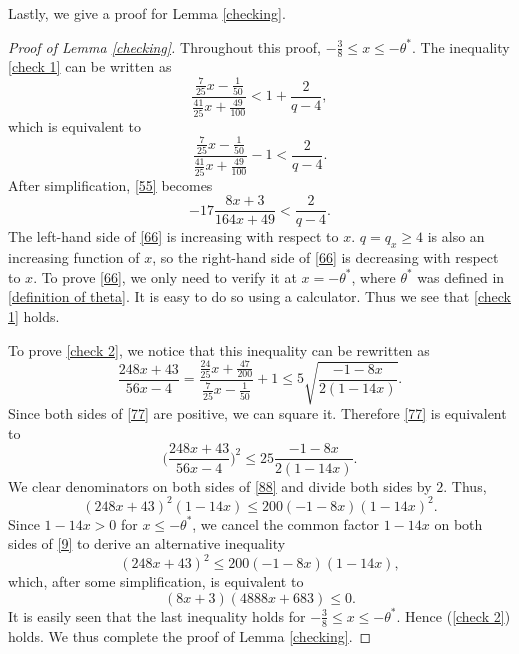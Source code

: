 \documentclass[11pt]{amsart}
\numberwithin{equation}{section}
\theoremstyle{definition}
\theoremstyle{proposition}
\begin{document}
Lastly, we give a proof for Lemma \ref{checking}.
\begin{proof} [Proof of Lemma \ref{checking}] Throughout this proof, $-\frac{3}{8}\le x\le -\theta^*$. The inequality
\eqref{check 1} can be written as
\[
\frac{\frac{7}{25}x-\frac{1}{50}}{\frac{41}{25}x+\frac{49}{100}} <1+\frac{2}{q-4},
\]
which is equivalent to 
\begin{equation}  \label{55}
\frac{\frac{7}{25}x-\frac{1}{50}}{\frac{41}{25}x+\frac{49}{100}}-1< \frac{2}{q-4}.    
\end{equation}
After simplification, \eqref{55} becomes 
\begin{equation}   \label{66}
-17\frac{8x+3}{164x+49}<\frac{2}{q-4}.    
\end{equation}
The left-hand side of \eqref{66} is increasing with respect to $x$. $q=q_x\ge 4$ is also an increasing function of $x$, so the right-hand side of \eqref{66} is decreasing with respect to $x$. To prove \eqref{66}, we only need to verify it at $x=-\theta^*$, where $\theta^*$ was defined in \eqref{definition of theta}. It is easy to do so using a calculator. Thus we see that \eqref{check 1} holds.

\quad

To prove \eqref{check 2}, we notice that this inequality can be rewritten as 
\begin{equation}  \label{77}
\frac{248x+43}{56x-4}=\frac{\frac{24}{25}x+\frac{47}{200}}{\frac{7}{25}x-\frac{1}{50}}+1 \le 5\sqrt{\frac{-1-8x}{2(1-14x)}}.    
\end{equation}
Since both sides of \eqref{77} are positive, we can square it. Therefore \eqref{77} is equivalent to 
\begin{equation}  \label{88}
\Big(\frac{248x+43}{56x-4}\Big)^2 \le 25 \frac{-1-8x}{2(1-14x)}. \end{equation}
We clear denominators on both sides of \eqref{88} and divide both sides by $2$. Thus, 
\begin{equation}  \label{9}
(248x+43)^2 (1-14x)\le 200 (-1-8x)(1-14x)^2.    
\end{equation}
Since $1-14x>0$ for $x\le -\theta^*$, we cancel the common factor $1-14x$ on both sides of \eqref{9} to derive an alternative inequality
\[
(248x+43)^2 \le 200 (-1-8x)(1-14x), 
\]
which, after some simplification, is equivalent to 
\[
(8x+3)(4888x+683)\le 0.
\]
It is easily seen that the last inequality holds for $-\frac{3}{8}\le x\le -\theta^*$. 
Hence (\ref{check 2}) holds. We thus complete the proof of Lemma \ref{checking}.
\end{proof}
\end{document}
